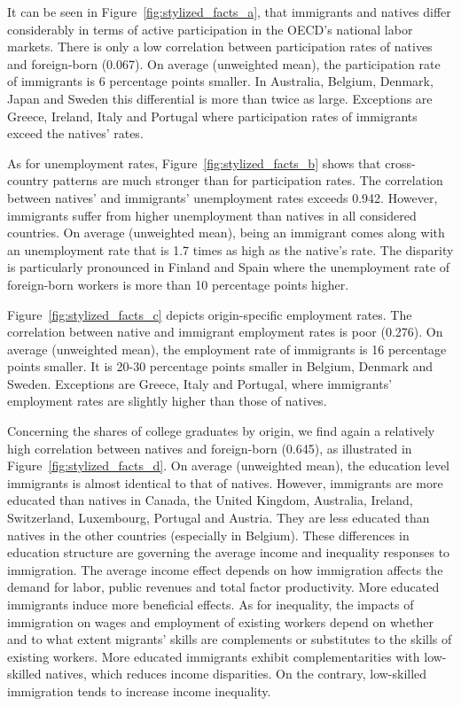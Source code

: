 \documentclass[a4paper,12pt]{article}
\begin{document}
It can be seen in Figure~\ref{fig:stylized_facts_a}, that immigrants and natives differ considerably in terms of active participation in the OECD's national labor markets. There is only a low correlation between participation rates of natives and foreign-born (0.067). On average (unweighted mean), the participation rate of immigrants is 6 percentage points smaller. In Australia, Belgium, Denmark, Japan and Sweden this differential is more than twice as large. Exceptions are Greece, Ireland, Italy and Portugal where participation rates of immigrants exceed the natives' rates.

As for unemployment rates, Figure~\ref{fig:stylized_facts_b} shows that cross-country patterns are much stronger than for participation rates. The correlation between natives' and immigrants' unemployment rates exceeds 0.942. However, immigrants suffer from higher unemployment than natives in all considered countries. On average (unweighted mean), being an immigrant comes along with an unemployment rate that is 1.7 times as high as the native's rate. The disparity is particularly pronounced in Finland and Spain where the unemployment rate of foreign-born workers is more than 10 percentage points higher. 

Figure~\ref{fig:stylized_facts_c} depicts origin-specific employment rates. The correlation between native and immigrant employment rates is poor (0.276). On average (unweighted mean), the employment rate of immigrants is 16 percentage points smaller. It is 20-30 percentage points smaller in Belgium, Denmark and Sweden. Exceptions are Greece, Italy and Portugal, where immigrants' employment rates are slightly higher than those of natives.

Concerning the shares of college graduates by origin, we find again a relatively high correlation between natives and foreign-born (0.645), as illustrated in Figure~\ref{fig:stylized_facts_d}. On average (unweighted mean), the education level immigrants is almost identical to that of natives. However, immigrants are more educated than natives in Canada, the United Kingdom, Australia, Ireland, Switzerland, Luxembourg, Portugal and Austria. They are less educated than natives in the other countries (especially in Belgium). These differences in education structure are governing the average income and inequality responses to immigration. The average income effect depends on how immigration affects the demand for labor, public revenues and total factor productivity. More educated immigrants induce more beneficial effects. As for inequality, the impacts of immigration on wages and employment of existing workers depend on whether and to what extent migrants’ skills are complements or substitutes to the skills of existing workers. More educated immigrants exhibit complementarities with low-skilled natives, which reduces income disparities. On the contrary, low-skilled immigration tends to increase income inequality.
\end{document}
